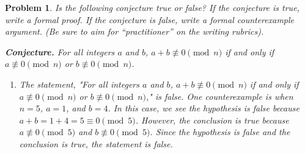 \documentclass[12pt]{article}
\newtheorem{problem}{Problem} %
\theoremstyle{definition}
\begin{document}
\bigskip

\begin{problem}
Is the following conjecture true or false? If the conjecture is true, write a formal proof. If the conjecture is false, write a formal counterexample argument. (Be sure to aim for “practitioner” on the writing rubrics).

\textbf{Conjecture.} For all integers \( a \) and \( b \), \( a + b \not\equiv 0 \pmod{n} \) if and only if \( a \not\equiv 0 \pmod{n} \) or \( b \not\equiv 0 \pmod{n} \).

\begin{enumerate}[label=(\alph*)]
    \item The statement, "For all integers \( a \) and \( b \), \( a + b \not\equiv 0 \pmod{n} \) if and only if \( a \not\equiv 0 \pmod{n} \) or \( b \not\equiv 0 \pmod{n} \)," is false. One counterexample is when \( n = 5 \), \( a = 1 \), and \( b = 4 \). In this case, we see the hypothesis is false because \( a + b = 1 + 4 = 5 \equiv 0 \pmod{5} \). However, the conclusion is true because \( a \not\equiv 0 \pmod{5} \) and \( b \not\equiv 0 \pmod{5} \). Since the hypothesis is false and the conclusion is true, the statement is false.
    
\end{enumerate}

\end{problem}

\bigskip
\end{document}
